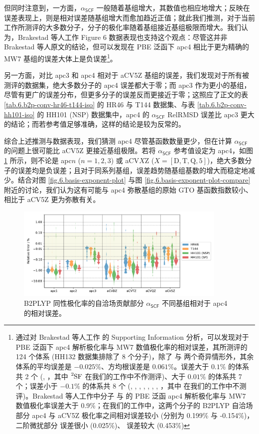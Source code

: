 但同时注意到，一方面，$\alpha_\textsf{SCF}$ 一般随着基组增大，其数值也相应地增大；反映在误差表现上，则是相对误差随基组增大而愈加趋近正值；就此我们推测，对于当前工作所测评的大多数分子，分子的极化率随着基组接近基组极限而增大。我们认为，Brakestad 等人工作\cite{Brakestad-Frediani.JCTC.2020} Figure 6 数据表现也支持这个观点：尽管这并非 Brakestad 等人原文的结论，但可以发现在 PBE 泛函下 apc4 相比于更为精确的 MW7 基组的误差大体上是负误差\footnote{通过对 Brakestad 等人工作\cite{Brakestad-Frediani.JCTC.2020} 的 Supporting Information 分析，可以发现对于 PBE 泛函下 apc4 解析极化率与 MW7 数值极化率的相对误差，其所测评的 124 个体系 (HH132 数据集排除了 8 个分子)，除了  与  两个奇异情形外，其余体系的平均误差是 $-0.025\%$、方均根误差是 $0.061\%$。误差大于 $0.1\%$ 的体系共 2 个 (, ，其中 $\ce{^2SF}$ 在我们的工作中不作测评)、大于 $0.01\%$ 的体系共 7 个；误差小于 $-0.1\%$ 的体系共 8 个 (, , , , , , , ，其中  在我们的工作中不测评)。Brakestad 等人工作中分子  与  的 PBE 泛函 apc4 解析极化率与 MW7 数值极化率误差大于 0.9\%；在我们的工作中，这两个分子的 B2PLYP 自洽场部分 apc4 与 aCV5Z 极化率之间相对误差较小 (分别为 0.199\% 与 -0.154\%)，二阶微扰部分  误差很小 (0.025\%)、 误差较大 (0.453\%)}。

另一方面，对比 apc3 和 apc4 相对于 aCV5Z 基组的误差，我们发现对于所有被测评的数据集，绝大多数分子的 apc4 误差都大于零；而 apc3 作为更小的基组，尽管有更广的误差分布，但更多分子的误差反而更接近于零；这照应了正文的表 \ref{tab.6.b2p-conv-hr46-t144-iso} 的 HR46 与 T144 数据集、与表 \ref{tab.6.b2p-conv-hh101-iso} 的 HH101 (NSP) 数据集中，apc4 的 $\alpha_\textsf{SCF}$ RelRMSD 误差比 apc3 更大的结论；而若参考值足够准确，这样的结论是较为反常的。

综合上述推测与数据表现，我们猜测 apc4 尽管基函数数量更少，但在计算 $\alpha_\textsf{SCF}$ 的问题上很可能比 aCV5Z 更接近基组极限。若将 $\alpha_\textsf{SCF}$ 参考值设定为 apc4，如图 \ref{fig.6.converg-b2p-scf-apc4} 所示，则不论是 apc$n$ ($n=1,2,3$) 或 aCV$X$Z ($X = \mathrm{[D,T,Q,5]}$)，绝大多数分子的误差均是负误差；且对于同系列基组，误差趋势随基组基数的增大而稳定地减少。结合对图 \ref{fig.6.basis-exponent-plot} 与图 \ref{fig.6.basis-exponent-plot-compare} 附近的讨论，我们认为这有可能与 apc4 弥散基组的原始 GTO 基函数指数较小、相比于 aCV5Z 更为弥散有关。

\begin{figure}[!ht]
    \centering
    \includegraphics[width=0.9\textwidth]{assets/converg-b2p-scf-apc4.pdf}
    \caption{B2PLYP 同性极化率的自洽场贡献部分 $\alpha_\textsf{SCF}$ 不同基组相对于 apc4 的相对误差。}
    \label{fig.6.converg-b2p-scf-apc4}
\end{figure}

